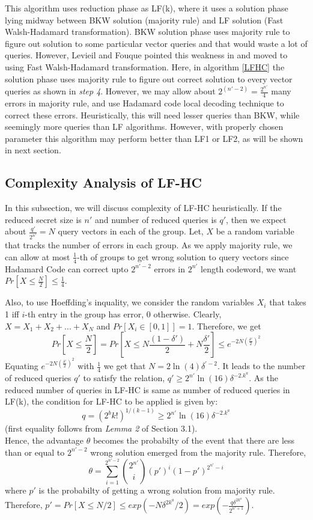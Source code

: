 \documentclass{article}
\begin{document}
 This algorithm uses reduction phase as LF(k), where it uses a solution phase lying midway between BKW solution (majority rule) and LF solution (Fast Walsh-Hadamard transformation). BKW solution phase uses majority rule to figure out solution to some particular vector queries and that would waste a lot of queries. However, Levieil and Fouque pointed this weakness in \cite{LF} and moved to using Fast Walsh-Hadamard transformation. Here, in algorithm \ref{LFHC} the solution phase uses majority rule to figure out correct solution to every vector queries as shown in \emph{step 4}. However, we may allow about $2^{(n'-2)}=\frac{2^{n'}}{4}$ many errors in majority rule, and use Hadamard code local decoding technique to correct these errors. Heuristically, this will need lesser queries than BKW, while seemingly more queries than LF algorithms. However, with properly chosen parameter this algorithm may perform better than LF1 or LF2, as will be shown in next section.
 
 \subsection[3.3]{Complexity Analysis of LF-HC}
 In this subsection, we will discuss complexity of LF-HC heuristically. If the reduced secret size is $n'$ and number of reduced queries is $q'$, then we expect about $\frac{q'}{2^{n'}}=N$ query vectors in each of the group. Let, $X$ be a random variable that tracks the number of errors in each group. As we apply majority rule, we can allow at most $\frac{1}{4}$-th of groups to get wrong solution to query vectors since Hadamard Code can correct upto $2^{n'-2}$ errors in $2^{n'}$ length codeword, we want $Pr[X\le\frac{N}{2}]\le\frac{1}{4}$.
 
 Also, to use Hoeffding's inquality, we consider the random variables $X_i$ that takes 1 iff $i$-th entry in the group has error, $0$ otherwise. Clearly, $X=X_1 +X_2+...+X_N$ and $Pr[X_i\in[0,1]]=1$. Therefore, we get $$Pr[X\le\frac{N}{2}]=Pr[X\le N\frac{(1-\delta')}{2}+N\frac{\delta'}{2}]\le e^{-2N(\frac{\delta'}{2})^2}$$
 Equating $e^{-2N(\frac{\delta'}{2})^2}$ with $\frac{1}{4}$ we get that $N= 2\ln(4)\delta^{'-2}$. It leads to the number of reduced queries $q'$ to satisfy the relation, $q'\geq 2^{n'}\ln(16)\delta^{-2.k^{a}}$. As the reduced number of queries in LF-HC is same as number of reduced queries in LF(k), the condition for LF-HC to be applied is given by: $$q=(2^bk!)^{1/(k-1)} \geq 2^{n'}\ln(16)\delta^{-2.k^{a}}$$ (first equality follows from \emph{Lemma 2} of Section 3.1).\\
 Hence, the advantage $\theta$ becomes the probabilty of the event that there are less than or equal to $2^{n'-2}$ wrong solution emerged from the majority rule. Therefore, $$\theta=\sum_{i=1}^{2^{n'-2}}\binom{2^{n'}}{i}{(p')}^i{(1-p')^{2^{n'}-i}}$$where $p'$ is the probabilty of getting a wrong solution from majority rule. Therefore, $p'=Pr[X\leq N/2]\leq exp{(-N\delta^{2k^a}/2)}=exp(-\frac{q\delta^{2k^a}}{2^{n'+1}})$.
 
\end{document}
